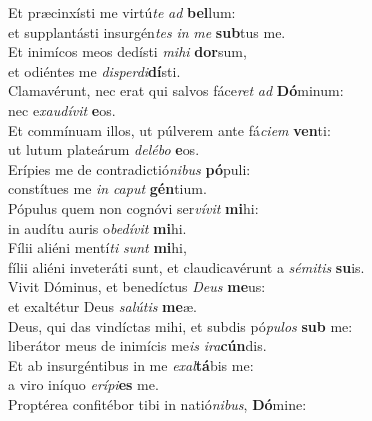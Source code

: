 \oddverse Et præcinxísti me virtú\textit{te} \textit{ad} \textbf{bel}lum:~\*\\
\oddverse et supplantásti insurgén\textit{tes} \textit{in} \textit{me} \textbf{sub}tus me.\\
\evenverse Et inimícos meos dedísti \textit{mi}\textit{hi} \textbf{dor}sum,~\*\\
\evenverse et odiéntes me \textit{di}\textit{sper}\textit{di}\textbf{dí}sti.\\
\oddverse Clamavérunt, nec erat qui salvos fáce\textit{ret} \textit{ad} \textbf{Dó}minum:~\*\\
\oddverse nec e\textit{xau}\textit{dí}\textit{vit} \textbf{e}os.\\
\evenverse Et commínuam illos, ut púlverem ante fá\textit{ci}\textit{em} \textbf{ven}ti:~\*\\
\evenverse ut lutum plateárum \textit{de}\textit{lé}\textit{bo} \textbf{e}os.\\
\oddverse Erípies me de contradictió\textit{ni}\textit{bus} \textbf{pó}puli:~\*\\
\oddverse constítues me \textit{in} \textit{ca}\textit{put} \textbf{gén}tium.\\
\evenverse Pópulus quem non cognóvi ser\textit{ví}\textit{vit} \textbf{mi}hi:~\*\\
\evenverse in audítu auris o\textit{be}\textit{dí}\textit{vit} \textbf{mi}hi.\\
\oddverse Fílii aliéni mentí\textit{ti} \textit{sunt} \textbf{mi}hi,~\*\\
\oddverse fílii aliéni inveteráti sunt, et claudicavérunt a \textit{sé}\textit{mi}\textit{tis} \textbf{su}is.\\
\evenverse Vivit Dóminus, et benedíctus \textit{De}\textit{us} \textbf{me}us:~\*\\
\evenverse et exaltétur Deus \textit{sa}\textit{lú}\textit{tis} \textbf{me}æ.\\
\oddverse Deus, qui das vindíctas mihi, et subdis pó\textit{pu}\textit{los} \textbf{sub} me:~\*\\
\oddverse liberátor meus de inimícis me\textit{is} \textit{i}\textit{ra}\textbf{cún}dis.\\
\evenverse Et ab insurgéntibus in me \textit{e}\textit{xal}\textbf{tá}bis me:~\*\\
\evenverse a viro iníquo \textit{e}\textit{rí}\textit{pi}\textbf{es} me.\\
\oddverse Proptérea confitébor tibi in natió\textit{ni}\textit{bus}, \textbf{Dó}mine:~\*\\
